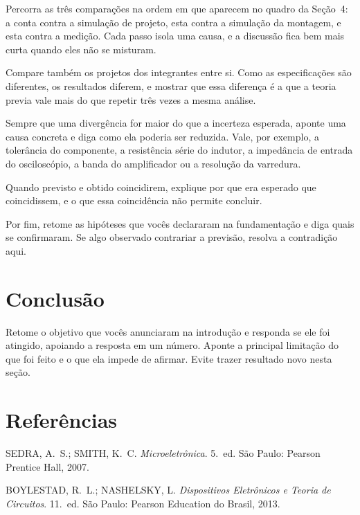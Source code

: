 \documentclass[11pt,a4paper]{article}
\begin{document}
Percorra as três comparações na ordem em que aparecem no quadro da Seção~4: a conta contra
a simulação de projeto, esta contra a simulação da montagem, e esta contra a medição. Cada
passo isola uma causa, e a discussão fica bem mais curta quando eles não se misturam.

Compare também os projetos dos integrantes entre si. Como as especificações são diferentes,
os resultados diferem, e mostrar que essa diferença é a que a teoria previa vale mais do
que repetir três vezes a mesma análise.

Sempre que uma divergência for maior do que a incerteza esperada, aponte uma causa concreta
e diga como ela poderia ser reduzida. Vale, por exemplo, a tolerância do componente, a
resistência série do indutor, a impedância de entrada do osciloscópio, a banda do
amplificador ou a resolução da varredura.

Quando previsto e obtido coincidirem, explique por que era esperado que coincidissem, e o
que essa coincidência não permite concluir.

Por fim, retome as hipóteses que vocês declararam na fundamentação e diga quais se
confirmaram. Se algo observado contrariar a previsão, resolva a contradição aqui.

\section{Conclusão}

Retome o objetivo que vocês anunciaram na introdução e responda se ele foi atingido,
apoiando a resposta em um número. Aponte a principal limitação do que foi feito e o que
ela impede de afirmar. Evite trazer resultado novo nesta seção.

\section{Referências}

\begin{referencias}
\item SEDRA, A.~S.; SMITH, K.~C. \emph{Microeletrônica}. 5.~ed. São Paulo: Pearson
      Prentice Hall, 2007.
\item BOYLESTAD, R.~L.; NASHELSKY, L. \emph{Dispositivos Eletrônicos e Teoria de
      Circuitos}. 11.~ed. São Paulo: Pearson Education do Brasil, 2013.
\end{referencias}
\end{document}
